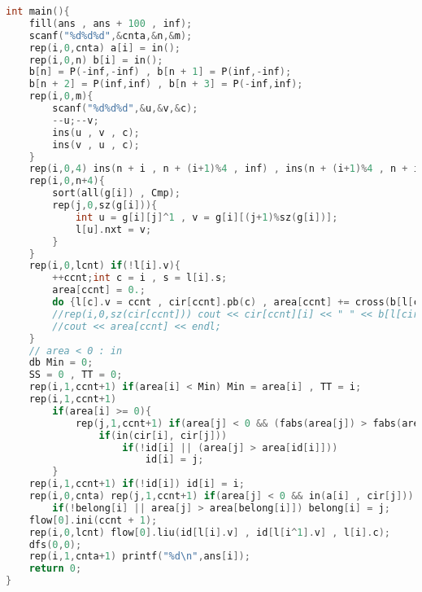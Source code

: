 \begin{lstlisting}[language=C++]
int main(){
    fill(ans , ans + 100 , inf);
    scanf("%d%d%d",&cnta,&n,&m);
    rep(i,0,cnta) a[i] = in();
    rep(i,0,n) b[i] = in();
    b[n] = P(-inf,-inf) , b[n + 1] = P(inf,-inf);
    b[n + 2] = P(inf,inf) , b[n + 3] = P(-inf,inf);
    rep(i,0,m){
        scanf("%d%d%d",&u,&v,&c);
        --u;--v;
        ins(u , v , c);
        ins(v , u , c);
    }
    rep(i,0,4) ins(n + i , n + (i+1)%4 , inf) , ins(n + (i+1)%4 , n + i , inf);
    rep(i,0,n+4){
        sort(all(g[i]) , Cmp);
        rep(j,0,sz(g[i])){
            int u = g[i][j]^1 , v = g[i][(j+1)%sz(g[i])];
            l[u].nxt = v;
        }
    }
    rep(i,0,lcnt) if(!l[i].v){
        ++ccnt;int c = i , s = l[i].s;
        area[ccnt] = 0.;
        do {l[c].v = ccnt , cir[ccnt].pb(c) , area[ccnt] += cross(b[l[c].s],b[l[c].t]) , c = l[c].nxt;}while(l[c].s != s);
        //rep(i,0,sz(cir[ccnt])) cout << cir[ccnt][i] << " " << b[l[cir[ccnt][i]].s] << " \n"[i == sz(cir[ccnt]) - 1];
        //cout << area[ccnt] << endl;
    }
    // area < 0 : in
    db Min = 0;
    SS = 0 , TT = 0;
    rep(i,1,ccnt+1) if(area[i] < Min) Min = area[i] , TT = i;
    rep(i,1,ccnt+1)
        if(area[i] >= 0){
            rep(j,1,ccnt+1) if(area[j] < 0 && (fabs(area[j]) > fabs(area[i])))
                if(in(cir[i], cir[j]))
                    if(!id[i] || (area[j] > area[id[i]]))
                        id[i] = j;
        }
    rep(i,1,ccnt+1) if(!id[i]) id[i] = i;
    rep(i,0,cnta) rep(j,1,ccnt+1) if(area[j] < 0 && in(a[i] , cir[j]))
        if(!belong[i] || area[j] > area[belong[i]]) belong[i] = j;
    flow[0].ini(ccnt + 1);
    rep(i,0,lcnt) flow[0].liu(id[l[i].v] , id[l[i^1].v] , l[i].c);
    dfs(0,0);
    rep(i,1,cnta+1) printf("%d\n",ans[i]);
    return 0;
}
\end{lstlisting}

